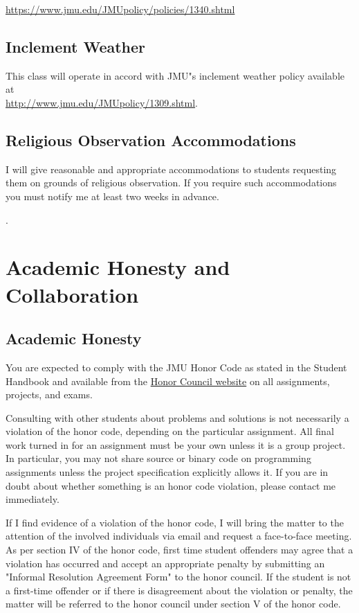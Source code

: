 \documentclass[11pt]{article}
\begin{document}
\url{https://www.jmu.edu/JMUpolicy/policies/1340.shtml}


\subsection{Inclement Weather}
This class will operate in accord with JMU"s inclement weather policy
available at \\ 
 \href{http://www.jmu.edu/JMUpolicy/1309.shtml}{http://www.jmu.edu/JMUpolicy/1309.shtml}.  

\subsection{Religious Observation Accommodations}
I will give reasonable and appropriate accommodations to students requesting them on grounds of religious observation. 
If you require such accommodations you must notify me at least two weeks in advance.
 
.

\section{Academic Honesty and Collaboration}

\subsection{Academic Honesty}
You are expected to comply with the JMU Honor Code as stated in the Student Handbook and available from the 
\href{http://www.jmu.edu/honorcode}{Honor Council website} on all assignments, projects, and exams. 

Consulting with other students about problems and solutions is not necessarily a violation of the honor code, depending on the particular assignment. All final work turned in for an assignment must be your own unless it is a group project. In particular, you may not share source or binary code on programming assignments unless the project specification explicitly allows it. If you are in doubt about whether something is an honor code violation, please contact me immediately. 

If I find evidence of a violation of the honor code, I will bring the matter to the attention of the involved individuals via email and request a face-to-face meeting. As per section IV of the honor code, first time student offenders may agree that a violation has occurred and accept an appropriate penalty by submitting an "Informal Resolution Agreement Form" to the honor council. If the student is not a first-time offender or if there is disagreement about the violation or penalty, the matter will be referred to the honor council 
under section V of the honor code. 
\end{document}
